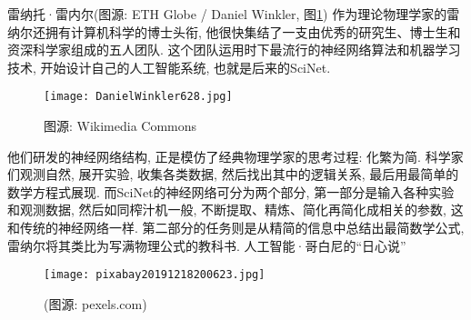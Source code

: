 雷纳托·雷内尔(图源: ETH Globe / Daniel Winkler, 图\ref{DanielWinkler628fig15})
作为理论物理学家的雷纳尔还拥有计算机科学的博士头衔, 他很快集结了一支由优秀的研究生、博士生和资深科学家组成的五人团队. 这个团队运用时下最流行的神经网络算法和机器学习技术, 开始设计自己的人工智能系统, 也就是后来的SciNet.
\begin{figure}[H]
\centering
\texttt{[image: DanielWinkler628.jpg]}
\caption{图源: Wikimedia Commons}
\label{DanielWinkler628fig15}
\end{figure}
他们研发的神经网络结构, 正是模仿了经典物理学家的思考过程: 化繁为简.
科学家们观测自然, 展开实验, 收集各类数据, 然后找出其中的逻辑关系, 最后用最简单的数学方程式展现. 而SciNet的神经网络可分为两个部分, 第一部分是输入各种实验和观测数据, 然后如同榨汁机一般, 不断提取、精炼、简化再简化成相关的参数, 这和传统的神经网络一样. 第二部分的任务则是从精简的信息中总结出最简数学公式, 雷纳尔将其类比为写满物理公式的教科书.
人工智能·哥白尼的“日心说”
\begin{figure}[H]
\centering
\texttt{[image: pixabay20191218200623.jpg]}
\caption{(图源: pexels.com)}
\label{pixabay20191218200623}
\end{figure}

